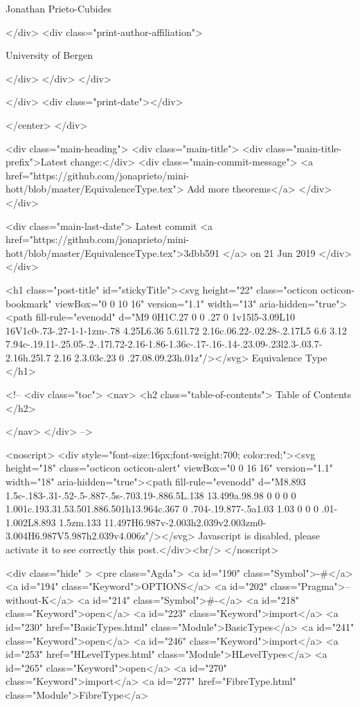                   Jonathan Prieto-Cubides
                
              </div>
              <div class="print-author-affiliation">
                
                  University of Bergen
                
                </div>
            </div>
          </div>
          
          
        </div>
        <div class="print-date"></div>
        
        
    </center>
  </div>

  
  <div class="main-heading">
    <div class="main-title">
      <div class="main-title-prefix">Latest change:</div>
      <div class="main-commit-message">
            <a href="https://github.com/jonaprieto/mini-hott/blob/master/EquivalenceType.tex">
              Add more theorems</a>
      </div>
    </div>

    <div class="main-last-date">
      Latest commit <a href="https://github.com/jonaprieto/mini-hott/blob/master/EquivalenceType.tex">3dbb591 </a> on  21 Jun 2019
    </div>
  </div>
  
  <h1 class="post-title" id="stickyTitle"><svg height="22" class="octicon octicon-bookmark" viewBox="0 0 10 16" version="1.1" width="13" aria-hidden="true"><path fill-rule="evenodd" d="M9 0H1C.27 0 0 .27 0 1v15l5-3.09L10 16V1c0-.73-.27-1-1-1zm-.78 4.25L6.36 5.61l.72 2.16c.06.22-.02.28-.2.17L5 6.6 3.12 7.94c-.19.11-.25.05-.2-.17l.72-2.16-1.86-1.36c-.17-.16-.14-.23.09-.23l2.3-.03.7-2.16h.25l.7 2.16 2.3.03c.23 0 .27.08.09.23h.01z"/></svg> Equivalence Type
  </h1>

  <!-- 
  <div class="toc">
    <nav>
    <h2 class="table-of-contents"> Table of Contents </h2>
      

    </nav>
  </div>
   -->

  <noscript>
  <div style="font-size:16px;font-weight:700; color:red;"><svg height="18" class="octicon octicon-alert" viewBox="0 0 16 16" version="1.1" width="18" aria-hidden="true"><path fill-rule="evenodd" d="M8.893 1.5c-.183-.31-.52-.5-.887-.5s-.703.19-.886.5L.138 13.499a.98.98 0 0 0 0 1.001c.193.31.53.501.886.501h13.964c.367 0 .704-.19.877-.5a1.03 1.03 0 0 0 .01-1.002L8.893 1.5zm.133 11.497H6.987v-2.003h2.039v2.003zm0-3.004H6.987V5.987h2.039v4.006z"/></svg> Javascript is disabled, please activate it to see correctly this post.</div><br/>
  </noscript>

  <div class="hide" >
<pre class="Agda">
<a id="190" class="Symbol">{-#</a> <a id="194" class="Keyword">OPTIONS</a> <a id="202" class="Pragma">--without-K</a> <a id="214" class="Symbol">#-}</a>
<a id="218" class="Keyword">open</a> <a id="223" class="Keyword">import</a> <a id="230" href="BasicTypes.html" class="Module">BasicTypes</a>
<a id="241" class="Keyword">open</a> <a id="246" class="Keyword">import</a> <a id="253" href="HLevelTypes.html" class="Module">HLevelTypes</a>
<a id="265" class="Keyword">open</a> <a id="270" class="Keyword">import</a> <a id="277" href="FibreType.html" class="Module">FibreType</a>

